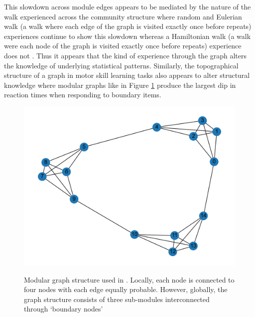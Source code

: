 This slowdown across module edges appears to be mediated by the nature of the walk experienced across the community structure where random and Eulerian walk (a walk where each edge of the graph is visited exactly once before repeats) experiences continue to show this slowdown whereas a Hamiltonian walk (a walk were each node of the graph is visited exactly once before repeats) experience does not \cite{karuza2017process}. Thus it appears that the kind of experience through the graph alters the knowledge of underlying statistical patterns. Similarly, the topographical structure of a graph in motor skill learning tasks also appears to alter structural knowledge \cite{lynn2020abstract, lynn2020human, lynn2020humans} where modular graphs like in Figure \ref{fig:modular_graph} produce the largest dip in reaction times when responding to boundary items. 

\begin{figure}[ht]
	\centering
	\caption{Modular graph structure used in \cite{schapiro2013neural}. Locally, each node is connected to four nodes with each edge equally probable. However, globally, the graph structure consists of three sub-modules interconnected through `boundary nodes'}
	\includegraphics[width = \textwidth]{chapter_notebooks/chapter_2/figures/modular_graph.png}
	\label{fig:modular_graph}
\end{figure}

